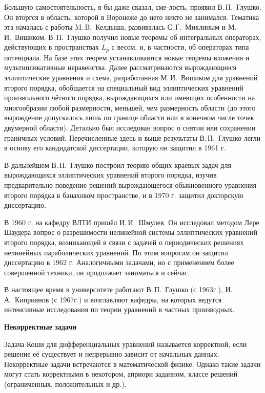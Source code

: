 Большую самостоятельность, я бы даже сказал,
сме-\linebreak лость,
проявил В.\,П.~Глушко.
Он вторгся в область, которой в Воронеже до него никто не занимался. Тематика эта началась с работы M.\,B.~Келдыша, развивалась С.\,Г.~Михлиным и М.\,И.~Вишиком. В.\,П.~Глушко получил новые теоремы об интегральных операторах, действующих в пространствах  $L_p$ с весом, и, в частности, об операторах типа потенциала. На базе этих теорем устанавливаются новые теоремы вложения и мультипликативные неравенства. Далее рассматриваются вырождающиеся эллиптические уравнения и схема, разработанная М.\,И.~Вишиком для уравнений второго порядка, обобщается на специальный вид эллиптических уравнений произвольного чётного порядка, вырождающихся или имеющих особенности на многообразии любой размерности, меньшей, чем размерность области (до этого вырождение допускалось лишь по границе области или в конечном числе точек двумерной области). Детально был исследован вопрос о снятии или сохранении граничных условий. Перечисленные здесь и выше результаты В.\,П.~Глушко легли в основу его кандидатской диссертации, которую он защитил в 1961 г.

В дальнейшем В.\,П.~Глушко построил теорию общих краевых задач для вырождающихся эллиптических уравнений второго порядка, изучив предварительно поведение решений вырождающегося обыкновенного уравнения второго порядка в банаховом пространстве, и в 1970 г. защитил докторскую диссертацию.

В 1960 г. на кафедру ВЛТИ пришёл И.\,И.~Шмулев. Он исследовал методом Лере Шаудера вопрос о разрешимости нелинейной системы эллиптических уравнений второго порядка, возникающей в связи с задачей о периодических решениях нелинейных параболических уравнений. По этим вопросам он защитил диссертацию в 1962 г. Аналогичными задачами, но с применением более совершенной техники, он продолжает заниматься и сейчас.

В настоящее время в университете работают В.\,П.~Глушко (с 1963г.), И.\,А.~Киприянов (с 1967г.) и возглавляют кафедры, на которых ведутся интенсивные исследования по теории уравнений в частных производных.

{\bf Некорректные задачи}

Задача Коши для дифференциальных уравнений называется корректной, если решение её существует и непрерывно зависит от начальных данных. Некорректные задачи встречаются в математической физике. Однако такие задачи могут стать корректными в некотором, априори заданном, классе решений (ограниченных, положительных и др.).

